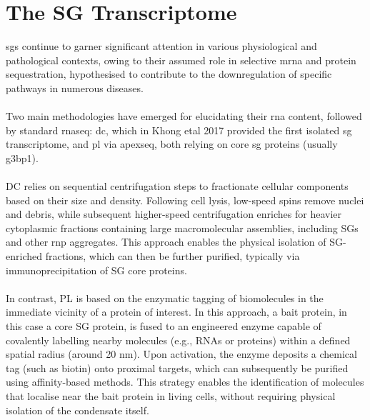 \chapter{The SG Transcriptome}
\label{chap:ChapterI}

\glspl{sg} continue to garner significant attention in various physiological and pathological contexts, owing to their assumed role in selective \gls{mrna} and protein sequestration, hypothesised to contribute to the downregulation of specific pathways in numerous diseases.
\\
\\
Two main methodologies have emerged for elucidating their \gls{rna} content, followed by standard \gls{rnaseq}: \gls{dc}, which in Khong \gls{etal} 2017 provided the first isolated \gls{sg} transcriptome\cite{khong_stress_2017}, and \gls{pl} via \gls{apexseq}\cite{padron_proximity_2019}, both relying on core \gls{sg} proteins (usually \gls{g3bp1}). 
\\
\\
DC relies on sequential centrifugation steps to fractionate cellular components based on their size and density\cite{khong_stress_2017}. Following cell lysis, low-speed spins remove nuclei and debris, while subsequent higher-speed centrifugation enriches for heavier cytoplasmic fractions containing large macromolecular assemblies, including SGs and other \gls{rnp} aggregates\cite{khong_stress_2017}. This approach enables the physical isolation of SG-enriched fractions, which can then be further purified, typically via immunoprecipitation of SG core proteins\cite{khong_stress_2017}.
\\
\\
In contrast, PL is based on the enzymatic tagging of biomolecules in the immediate vicinity of a protein of interest\cite{padron_proximity_2019}. In this approach, a bait protein, in this case a core SG protein, is fused to an engineered enzyme capable of covalently labelling nearby molecules (e.g., RNAs or proteins) within a defined spatial radius (around 20 \gls{nm})\cite{padron_proximity_2019}. Upon activation, the enzyme deposits a chemical tag (such as biotin) onto proximal targets, which can subsequently be purified using affinity-based methods\cite{padron_proximity_2019}. This strategy enables the identification of molecules that localise near the bait protein in living cells, without requiring physical isolation of the condensate itself\cite{padron_proximity_2019}.
\\
\\
